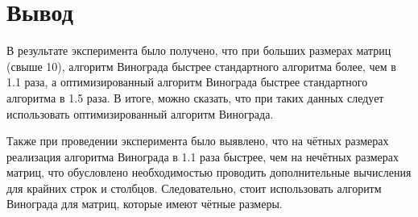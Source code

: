 \section{Вывод}
В результате эксперимента было получено, что при больших размерах матриц (свыше 10), алгоритм Винограда быстрее стандартного алгоритма более, чем в 1.1 раза, а оптимизированный алгоритм Винограда быстрее стандартного алгоритма в 1.5 раза. В итоге, можно сказать, что при таких данных следует использовать оптимизированный алгоритм Винограда. 

Также при проведении эксперимента было выявлено, что на чётных размерах реализация алгоритма Винограда в 1.1 раза быстрее, чем на нечётных размерах матриц, что обусловлено необходимостью проводить дополнительные вычисления для крайних строк и столбцов. Следовательно, стоит использовать алгоритм Винограда для матриц, которые имеют чётные размеры.
